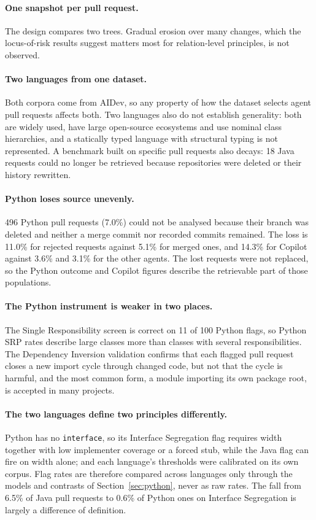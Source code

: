 \paragraph{One snapshot per pull request.} The design compares two trees. Gradual erosion over many
changes, which the locus-of-risk results suggest matters most for relation-level principles, is not
observed.

\paragraph{Two languages from one dataset.} Both corpora come from AIDev, so any property of how the
dataset selects agent pull requests affects both. Two languages also do not establish generality: both
are widely used, have large open-source ecosystems and use nominal class hierarchies, and a statically
typed language with structural typing is not represented. A benchmark built on specific pull requests
also decays: 18 Java requests could no longer be retrieved because repositories were deleted or their
history rewritten.

\paragraph{Python loses source unevenly.} 496 Python pull requests (7.0\%) could not be analysed
because their branch was deleted and neither a merge commit nor recorded commits remained. The loss is
11.0\% for rejected requests against 5.1\% for merged ones, and 14.3\% for Copilot against 3.6\% and
3.1\% for the other agents. The lost requests were not replaced, so the Python outcome and Copilot
figures describe the retrievable part of those populations.

\paragraph{The Python instrument is weaker in two places.} The Single Responsibility screen is correct
on 11 of 100 Python flags, so Python SRP rates describe large classes more than classes with several
responsibilities. The Dependency Inversion validation confirms that each flagged pull request closes
a new import cycle through changed code, but not that the cycle is harmful, and the most common form,
a module importing its own package root, is accepted in many projects.

\paragraph{The two languages define two principles differently.} Python has no \texttt{interface}, so
its Interface Segregation flag requires width together with low implementer coverage or a forced stub,
while the Java flag can fire on width alone; and each language's thresholds were calibrated on its own
corpus. Flag rates are therefore compared across languages only through the models and contrasts of
Section~\ref{sec:python}, never as raw rates. The fall from 6.5\% of Java pull requests to 0.6\% of
Python ones on Interface Segregation is largely a difference of definition.


